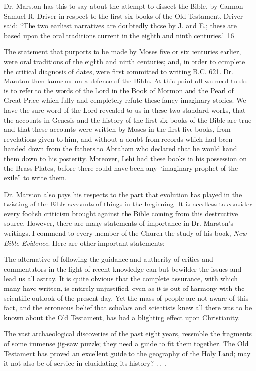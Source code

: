 Dr. Marston has this to say about the attempt to dissect the Bible, by Cannon Samuel R.
Driver in respect to the first six books of the Old Testament. Driver said: ``The two earliest
narratives are doubtedly those by J. and E.; these are based upon the oral traditions current in
the eighth and ninth centuries.'' 16

The statement that purports to be made by Moses five or six centuries earlier, were oral
traditions of the eighth and ninth centuries; and, in order to complete the critical diagnosis of
dates, were first committed to writing B.C. 621. Dr. Marston then launches on a defense of
the Bible. At this point all we need to do is to refer to the words of the Lord in the Book of
Mormon and the Pearl of Great Price which fully and completely refute these fancy
imaginary stories. We have the sure word of the Lord revealed to us in these two standard
works, that the accounts in Genesis and the history of the first six books of the Bible are true
and that these accounts were written by Moses in the first five books, from revelations given
to him, and without a doubt from records which had been handed down from the fathers to
Abraham who declared that he would hand them down to his posterity. Moreover, Lehi had
these books in his possession on the Brass Plates, before there could have been any
``imaginary prophet of the exile'' to write them.

Dr. Marston also pays his respects to the part that evolution has played in the twisting of the
Bible accounts of things in the beginning. It is needless to consider every foolish criticism
brought against the Bible coming from this destructive source. However, there are many
statements of importance in Dr. Marston's writings. I commend to every member of the
Church the study of his book, \textit{New Bible Evidence}. Here are other important statements:

The alternative of following the guidance and authority of critics and commentators in the
light of recent knowledge can but bewilder the issues and lead us all astray. It is quite
obvious that the complete assurance, with which many have written, is entirely unjustified,
even as it is out of harmony with the scientific outlook of the present day. Yet the mass of
people are not aware of this fact, and the erroneous belief that scholars and scientists knew
all there was to be known about the Old Testament, has had a blighting effect upon
Christianity.

The vast archaeological discoveries of the past eight years, resemble the fragments of some
immense jig-saw puzzle; they need a guide to fit them together. The Old Testament has
proved an excellent guide to the geography of the Holy Land; may it not also be of service in
elucidating its history? . . .

